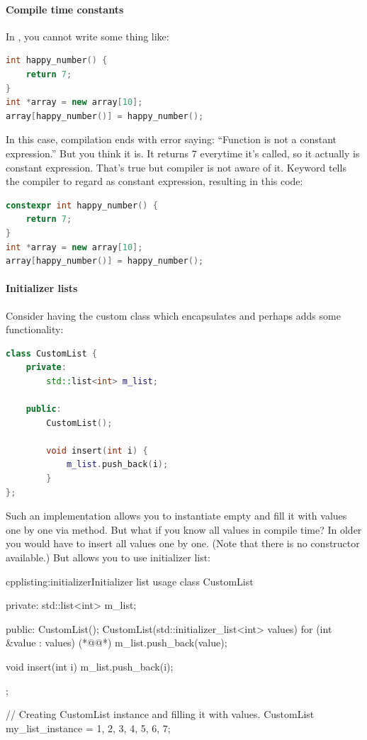 \paragraph*{Compile time constants}
In , you cannot write some thing like:
\begin{lstlisting}[firstnumber=1,language=cpp]
int happy_number() {
	return 7;
}
int *array = new array[10];
array[happy_number()] = happy_number();
\end{lstlisting}
In this case, compilation ends with error saying: \enquote{Function  is not a constant expression.} But you think it is. It returns $7$ everytime it's called, so it actually is constant expression. That's true but compiler is not aware of it. Keyword tells the compiler to regard as constant expression, resulting in this code:
\begin{lstlisting}[firstnumber=1,language=cpp]
constexpr int happy_number() {
	return 7;
}
int *array = new array[10];
array[happy_number()] = happy_number();
\end{lstlisting}

\paragraph*{Initializer lists}
Consider having the custom class which encapsulates and perhaps adds some functionality:
\begin{lstlisting}[firstnumber=1,language=cpp]
class CustomList {
	private:
		std::list<int> m_list;
	
	public:
		CustomList();
		
		void insert(int i) {
			m_list.push_back(i);		
		}
};
\end{lstlisting}
Such an implementation allows you to instantiate empty and fill it with values one by one via method. But what if you know all values in compile time? In older \cpp you would have to insert all values one by one. (Note that there is no constructor available.) But  allows you to use initializer list:
\begin{fdoccode}{cpp}{listing:initializer}{Initializer list usage}
class CustomList {
	private:
		std::list<int> m_list;
	
	public:
		CustomList();
		CustomList(std::initializer_list<int> values) {
			for (int &value : values) {(*@\label{listing:forloop}@*)
				m_list.push_back(value);			
			}
		}
		
		void insert(int i) {
			m_list.push_back(i);		
		}
};

// Creating CustomList instance and filling it with values.
CustomList my_list_instance = {1, 2, 3, 4, 5, 6, 7};
\end{fdoccode}

